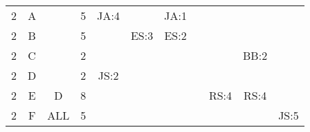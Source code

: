 \documentclass[12pt]{article}
\begin{document}
\begin{table}[H]
\begin{tabular}{@{}c|c|c|c|ccccccc@{}}
2     & A    &            & 5                                                      & JA:4                                            &                                                 & JA:1                                             &                                                  &                                                  &                                                  &                                                  \\
2     & B    &            & 5                                                      &                                                 & ES:3                                            & ES:2                                             &                                                  &                                                  &                                                  &                                                  \\
2     & C    &            & 2                                                      &                                                 &                                                 &                                                  &                                                  &                                                  & BB:2                                             &                                                  \\
2     & D    &            & 2                                                      & JS:2                                            &                                                 &                                                  &                                                  &                                                  &                                                  &                                                  \\ 
2     & E    & D          & 8                                                      &                                                 &                                                 &                                                  &                                                  &  RS:4                                            &  RS:4                                            &                                                  \\ 
2     & F    & ALL        & 5                                                      &                                                 &                                                 &                                                  &                                                  &                                                  &                                                  & JS:5                                             \\ \bottomrule
\end{tabular}
\end{table}
\end{document}
